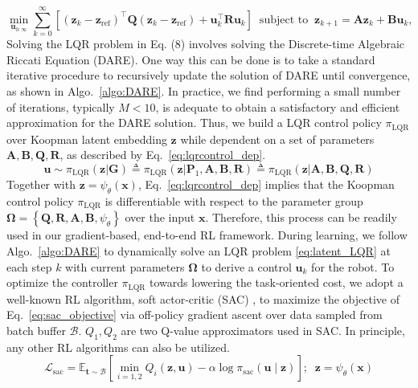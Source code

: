 \documentclass{article}
\begin{document}
\begin{equation}
 \min_{\mathbf{u}_{0:\infty}} \sum_{k=0}^{\infty}\left[\left(\mathbf{z}_k-\mathbf{z}_\text{ref}\right)^\top\mathbf{Q}\left(\mathbf{z}_k-\mathbf{z}_\text{ref}\right)+\mathbf{u}_k^\top \mathbf{R} \mathbf{u}_k\right] 
 \;\; \text {subject to} \;\; \mathbf{z}_{k+1}=\mathbf{A} \mathbf{z}_k+\mathbf{B}\mathbf{u}_k,
 \label{eq:latent_LQR}
\end{equation}
Solving the LQR problem in Eq. (8) involves solving the Discrete-time Algebraic Riccati Equation (DARE). One way this can be done is to take a standard iterative procedure to recursively update the solution of DARE until convergence, as shown in Algo.~\ref{algo:DARE}. 
%
In practice, we find performing a small number of iterations, typically $M < 10$, is adequate to obtain a satisfactory and efficient approximation for the DARE solution.
%
%
Thus, we build a LQR control policy $\pi_{\text{LQR}}$ over Koopman latent embedding $\mathbf{z}$ while dependent on a set of  parameters $\mathbf{A}, \mathbf{B}, \mathbf{Q}, \mathbf{R}$, as described by Eq.~\eqref{eq:lqrcontrol_dep}.
\begin{equation}
    \mathbf{u} \sim \pi_{\text{LQR}}(\mathbf{z}|\mathbf{G}) \triangleq \pi_{\text{LQR}}(\mathbf{z}|\mathbf{P}_1, \mathbf{A}, \mathbf{B}, \mathbf{R}) \triangleq \pi_{\text{LQR}}(\mathbf{z}|\mathbf{A}, \mathbf{B}, \mathbf{Q}, \mathbf{R})
    \label{eq:lqrcontrol_dep}
\end{equation}
Together with $\mathbf{z}=\psi_{\theta}(\mathbf{x})$, Eq.~\eqref{eq:lqrcontrol_dep} implies that the Koopman control policy $\pi_{\text{LQR}}$ is differentiable with respect to the parameter group $\boldsymbol{\Omega}=\left\{\mathbf{Q}, \mathbf{R}, \mathbf{A}, \mathbf{B}, \psi_{\theta} \right\}$ over the input $\mathbf{x}$. Therefore, this process can be readily used in our gradient-based,  end-to-end RL framework. 
During learning, we follow Algo.~\ref{algo:DARE} 
to dynamically solve an LQR problem \eqref{eq:latent_LQR}  at each step $k$ with current parameters $\boldsymbol{\Omega}$ to derive a control $\mathbf{u}_k$ for the robot.
%
To optimize the controller $\pi_{\text{LQR}}$ towards lowering the task-oriented cost, we adopt a well-known RL algorithm, soft actor-critic (SAC) \cite{haarnoja2018soft}, to maximize the objective of Eq.~\eqref{eq:sac_objective} via off-policy gradient ascent over data sampled from batch buffer $\mathcal{B}$. $Q_1, Q_2$ are two Q-value approximators used in SAC. In principle, any other RL algorithms can also be utilized. 
\begin{equation}
\mathcal{L}_\text{sac}=\mathbb{E}_{\mathbf{t} \sim \mathcal{B}}\left[\min _{i=1,2} Q_i(\mathbf{z}, \mathbf{u})-\alpha \log \pi_{\text{sac}}(\mathbf{u} \mid \mathbf{z})\right]; \;\; \mathbf{z} = \psi_{\theta}(\mathbf{x})
\label{eq:sac_objective}
\end{equation}
\end{document}
